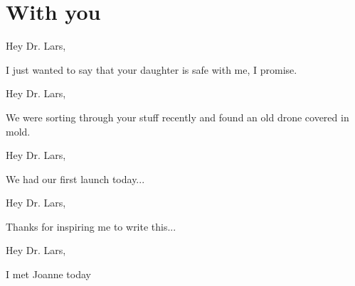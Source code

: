 \chapter{With you}

Hey Dr. Lars,

I just wanted to say that your daughter is safe with me, I promise.

Hey Dr. Lars,

We were sorting through your stuff recently and found an old drone covered in mold.

Hey Dr. Lars,

We had our first launch today...

Hey Dr. Lars,

Thanks for inspiring me to write this...

Hey Dr. Lars,

I met Joanne today
